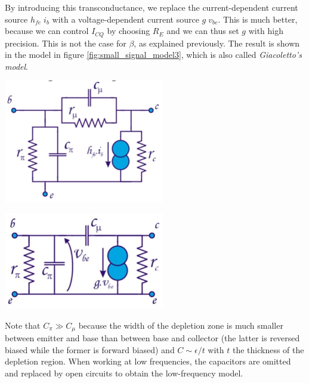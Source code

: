 By introducing this transconductance, we replace the current-dependent current source $h_{fe} \; i_b$ with a voltage-dependent current source $g \; v_{be}$. This is much better, because we can control $I_{CQ}$ by choosing $R_E$ and we can thus set $g$ with high precision. This is not the case for $\beta$, as explained previously. The result is shown in the model in figure \ref{fig:small_signal_model3}, which is also called \emph{Giacoletto's model}.

\begin{minipage}{.5\textwidth}
	\centering
	\includegraphics[width=7cm]{figures/ch02/small_signal_model2.jpg}
	\label{fig:small_signal_model2}
\end{minipage}%
\begin{minipage}{.5\textwidth}
	\centering
	\includegraphics[width=7cm]{figures/ch02/small_signal_model3.jpg}
	\label{fig:small_signal_model3}
\end{minipage}

Note that $C_{\pi} \gg C_{\mu}$ because the width of the depletion zone is much smaller between emitter and base than between base and collector (the latter is reversed biased while the former is forward biased) and $C \sim \epsilon/t$ with $t$ the thickness of the depletion region. When working at low frequencies, the capacitors are omitted and replaced by open circuits to obtain the low-frequency model.


